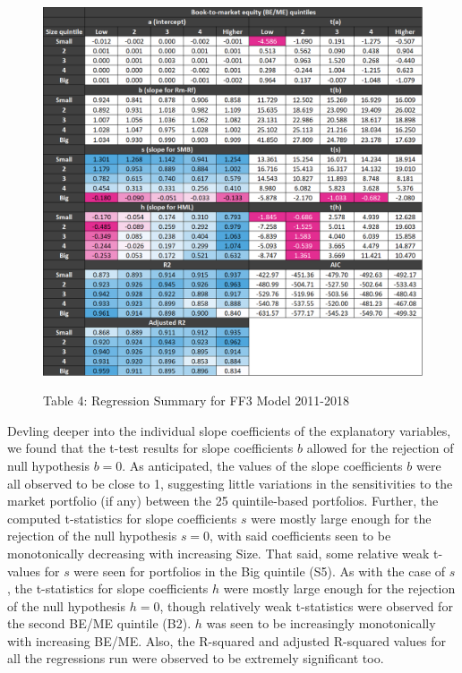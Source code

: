 \documentclass[12pt]{article}
\begin{document}
\begin{figure}[h]
	\centering
	\caption*{Table 4: Regression Summary for FF3 Model 2011-2018}
	\includegraphics[width=0.9\linewidth]{A5.png}
	\label{fig:label}
\end{figure}

\noindent Devling deeper into the individual slope coefficients of the explanatory variables, we found that the t-test results for slope coefficients $b$ allowed for the rejection of null hypothesis $b=0$. As anticipated, the values of the slope coefficients $b$ were all observed to be close to 1, suggesting little variations in the sensitivities to the market portfolio (if any) between the 25 quintile-based portfolios. Further, the computed t-statistics for slope coefficients $s$ were mostly large enough for the rejection of the null hypothesis $s=0$, with said coefficients seen to be monotonically decreasing with increasing Size. That said, some relative weak t-values for $s$ were seen for portfolios in the Big quintile (S5). As with the case of $s$, the t-statistics for slope coefficients $h$ were mostly large enough for the rejection of the null hypothesis $h=0$, though relatively weak t-statistics were observed for the second BE/ME quintile (B2). $h$ was seen to be increasingly monotonically with increasing BE/ME. Also, the R-squared and adjusted R-squared values for all the regressions run were observed to be extremely significant too.\\
\end{document}
